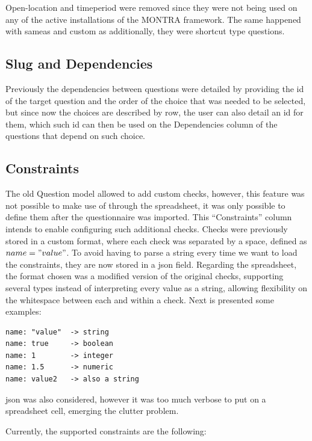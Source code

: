 Open-location and timeperiod were removed since they were not being used on any of the active installations of the MONTRA framework.
The same happened with sameas and custom as additionally, they were shortcut type questions.

\subsection*{Slug and Dependencies}

Previously the dependencies between questions were detailed by providing the id of the target question and the order of the choice that was needed to be selected, but since now the choices are described by row, the user can also detail an id for them, which such id can then be used on the Dependencies column of the questions that depend on such choice.

\subsection*{Constraints}

The old Question model allowed to add custom checks, however, this feature was not possible to make use of through the spreadsheet, it was only possible to define them after the questionnaire was imported.
This ``Constraints'' column intends to enable configuring such additional checks.
Checks were previously stored in a custom format, where each check was separated by a space, defined as $name="value"$.
To avoid having to parse a string every time we want to load the constraints, they are now stored in a \gls{json} field.
Regarding the spreadsheet, the format chosen was a modified version of the original checks, supporting several types instead of interpreting every value as a string, allowing flexibility on the whitespace between each and within a check.
Next is presented some examples:

\begin{verbatim}
name: "value"  -> string
name: true     -> boolean
name: 1        -> integer
name: 1.5      -> numeric
name: value2   -> also a string
\end{verbatim}

\gls{json} was also considered, however it was too much verbose to put on a spreadsheet cell, emerging the clutter problem.

Currently, the supported constraints are the following:

